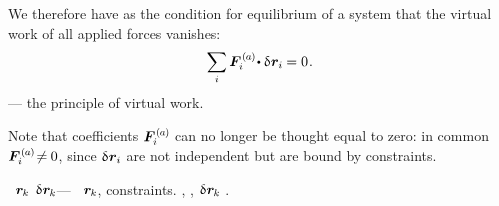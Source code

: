 We therefore have as the condition for equilibrium of a system that the virtual work of all applied forces vanishes:
\[
\displaystyle\sum_{\smash{i}} \activeforcewithindex{i} \hspace{-0.25ex} \dotp \variation{\hspace{.1ex}\locationvector_i} \hspace{-0.1ex} = 0
\hspace{.15ex} .
\]
--- the principle of virtual work.

Note that coefficients ${\activeforcewithindex{i}}$ can no longer be thought equal to zero: in common ${\activeforcewithindex{i} \hspace{-0.3ex} \neq \hspace{-0.1ex} 0}$, since ${\variation{\hspace{.1ex}\locationvector_i}}$ are not independent but are bound by constraints.

~${\bm{r}_{\hspace{-0.1ex}k}}$
${\variation{\hspace{.1ex}\locationvector_{\hspace{-0.1ex}k}}}$\:---
~${\bm{r}_{\hspace{-0.1ex}k}}$,
constraints\ru{)}.
,
,
${\variation{\hspace{.1ex}\locationvector_{\hspace{-0.1ex}k}}}$
.

